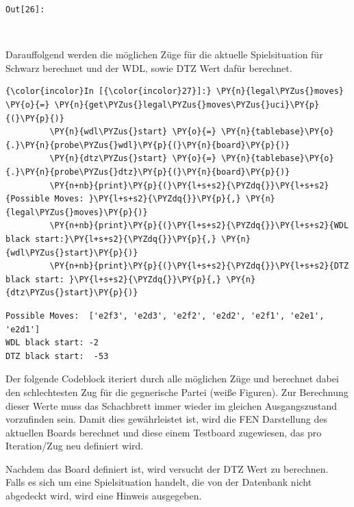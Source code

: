 \texttt{\color{outcolor}Out[{\color{outcolor}26}]:}
    
    \begin{center}
    \end{center}
    { \hspace*{\fill} \\}
    

    Darauffolgend werden die möglichen Züge für die aktuelle Spielsituation
für Schwarz berechnet und der WDL, sowie DTZ Wert dafür berechnet.

    \begin{Verbatim}[commandchars=\\\{\}]
{\color{incolor}In [{\color{incolor}27}]:} \PY{n}{legal\PYZus{}moves} \PY{o}{=} \PY{n}{get\PYZus{}legal\PYZus{}moves\PYZus{}uci}\PY{p}{(}\PY{p}{)}
         \PY{n}{wdl\PYZus{}start} \PY{o}{=} \PY{n}{tablebase}\PY{o}{.}\PY{n}{probe\PYZus{}wdl}\PY{p}{(}\PY{n}{board}\PY{p}{)}
         \PY{n}{dtz\PYZus{}start} \PY{o}{=} \PY{n}{tablebase}\PY{o}{.}\PY{n}{probe\PYZus{}dtz}\PY{p}{(}\PY{n}{board}\PY{p}{)}
         \PY{n+nb}{print}\PY{p}{(}\PY{l+s+s2}{\PYZdq{}}\PY{l+s+s2}{Possible Moves: }\PY{l+s+s2}{\PYZdq{}}\PY{p}{,} \PY{n}{legal\PYZus{}moves}\PY{p}{)}
         \PY{n+nb}{print}\PY{p}{(}\PY{l+s+s2}{\PYZdq{}}\PY{l+s+s2}{WDL black start:}\PY{l+s+s2}{\PYZdq{}}\PY{p}{,} \PY{n}{wdl\PYZus{}start}\PY{p}{)}
         \PY{n+nb}{print}\PY{p}{(}\PY{l+s+s2}{\PYZdq{}}\PY{l+s+s2}{DTZ black start: }\PY{l+s+s2}{\PYZdq{}}\PY{p}{,} \PY{n}{dtz\PYZus{}start}\PY{p}{)}
\end{Verbatim}


    \begin{Verbatim}[commandchars=\\\{\}]
Possible Moves:  ['e2f3', 'e2d3', 'e2f2', 'e2d2', 'e2f1', 'e2e1', 'e2d1']
WDL black start: -2
DTZ black start:  -53

    \end{Verbatim}

    Der folgende Codeblock iteriert durch alle möglichen Züge und berechnet
dabei den schlechtesten Zug für die gegnerische Partei (weiße Figuren).
Zur Berechnung dieser Werte muss das Schachbrett immer wieder im
gleichen Ausgangszustand vorzufinden sein. Damit dies gewährleistet ist,
wird die FEN Darstellung des aktuellen Boards berechnet und diese einem
Testboard zugewiesen, das pro Iteration/Zug neu definiert wird.

Nachdem das Board definiert ist, wird versucht der DTZ Wert zu
berechnen. Falls es sich um eine Spielsituation handelt, die von der
Datenbank nicht abgedeckt wird, wird eine Hinweis ausgegeben.

